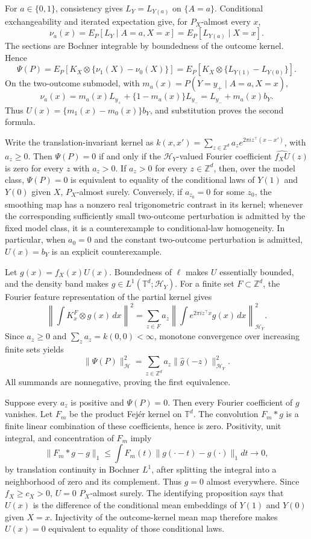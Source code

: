 For \(a\in\{0,1\}\), consistency gives \(L_Y=L_{Y(a)}\) on \(\{A=a\}\). Conditional exchangeability and iterated expectation give, for \(P_X\)-almost every \(x\),
\[
\nu_a(x)=E_P[L_Y\mid A=a,X=x]=E_P[L_{Y(a)}\mid X=x].
\]
The sections are Bochner integrable by boundedness of the outcome kernel. Hence
\[
\Psi(P)=E_P[K_X\otimes\{\nu_1(X)-\nu_0(X)\}]
=E_P[K_X\otimes\{L_{Y(1)}-L_{Y(0)}\}].
\]
On the two-outcome submodel, with \(m_a(x)=P(Y=y_+\mid A=a,X=x)\),
\[
\nu_a(x)=m_a(x)L_{y_+}+\{1-m_a(x)\}L_{y_-}
=L_{y_-}+m_a(x)b_Y.
\]
Thus \(U(x)=\{m_1(x)-m_0(x)\}b_Y\), and substitution proves the second formula.

Write the translation-invariant kernel as \(k(x,x')=\sum_{z\in\mathbb Z^d}a_z e^{2\pi i z^\top(x-x')}\), with \(a_z\ge0\). Then \(\Psi(P)=0\) if and only if the \(\mathcal H_Y\)-valued Fourier coefficient \(\widehat{f_XU}(z)\) is zero for every \(z\) with \(a_z>0\). If \(a_z>0\) for every \(z\in\mathbb Z^d\), then, over the model class, \(\Psi(P)=0\) is equivalent to equality of the conditional laws of \(Y(1)\) and \(Y(0)\) given \(X\), \(P_X\)-almost surely. Conversely, if \(a_{z_0}=0\) for some \(z_0\), the smoothing map has a nonzero real trigonometric contrast in its kernel; whenever the corresponding sufficiently small two-outcome perturbation is admitted by the fixed model class, it is a counterexample to conditional-law homogeneity. In particular, when \(a_0=0\) and the constant two-outcome perturbation is admitted, \(U(x)=b_Y\) is an explicit counterexample.

Let \(g(x)=f_X(x)U(x)\). Boundedness of \(\ell\) makes \(U\) essentially bounded, and the density band makes \(g\in L^1(\mathbb T^d;\mathcal H_Y)\). For a finite set \(F\subset\mathbb Z^d\), the Fourier feature representation of the partial kernel gives
\[
\left\|\int K_x^F\otimes g(x)\,dx\right\|^2
=\sum_{z\in F}a_z\left\|\int e^{2\pi i z^\top x}g(x)\,dx\right\|_{\mathcal H_Y}^2.
\]
Since \(a_z\ge0\) and \(\sum_z a_z=k(0,0)<\infty\), monotone convergence over increasing finite sets yields
\[
\|\Psi(P)\|_{\mathcal H}^2
=\sum_{z\in\mathbb Z^d}a_z\|\widehat g(-z)\|_{\mathcal H_Y}^2. \tag{1}
\]
All summands are nonnegative, proving the first equivalence.

Suppose every \(a_z\) is positive and \(\Psi(P)=0\). Then every Fourier coefficient of \(g\) vanishes. Let \(F_m\) be the product Fejér kernel on \(\mathbb T^d\). The convolution \(F_m*g\) is a finite linear combination of these coefficients, hence is zero. Positivity, unit integral, and concentration of \(F_m\) imply
\[
\|F_m*g-g\|_1\le\int F_m(t)\|g(\cdot-t)-g(\cdot)\|_1dt\longrightarrow0,
\]
by translation continuity in Bochner \(L^1\), after splitting the integral into a neighborhood of zero and its complement. Thus \(g=0\) almost everywhere. Since \(f_X\ge c_X>0\), \(U=0\) \(P_X\)-almost surely. The identifying proposition says that \(U(x)\) is the difference of the conditional mean embeddings of \(Y(1)\) and \(Y(0)\) given \(X=x\). Injectivity of the outcome-kernel mean map therefore makes \(U(x)=0\) equivalent to equality of those conditional laws.

